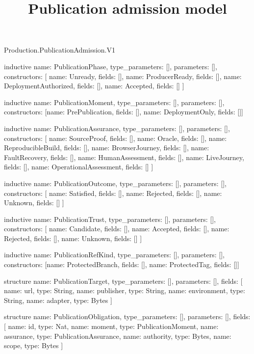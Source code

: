 \begin{lexlean}{Production.PublicationAdmission.V1}
\title{Publication admission model}
\begin{semanticmodule}
inductive{
  name: PublicationPhase,
  type_parameters: [],
  parameters: [],
  constructors: [
    {name: Unready, fields: []},
    {name: ProducerReady, fields: []},
    {name: DeploymentAuthorized, fields: []},
    {name: Accepted, fields: []}
  ]
}

inductive{
  name: PublicationMoment,
  type_parameters: [],
  parameters: [],
  constructors: [{name: PrePublication, fields: []}, {name: DeploymentOnly, fields: []}]
}

inductive{
  name: PublicationAssurance,
  type_parameters: [],
  parameters: [],
  constructors: [
    {name: SourceProof, fields: []},
    {name: Oracle, fields: []},
    {name: ReproducibleBuild, fields: []},
    {name: BrowserJourney, fields: []},
    {name: FaultRecovery, fields: []},
    {name: HumanAssessment, fields: []},
    {name: LiveJourney, fields: []},
    {name: OperationalAssessment, fields: []}
  ]
}

inductive{
  name: PublicationOutcome,
  type_parameters: [],
  parameters: [],
  constructors: [
    {name: Satisfied, fields: []},
    {name: Rejected, fields: []},
    {name: Unknown, fields: []}
  ]
}

inductive{
  name: PublicationTrust,
  type_parameters: [],
  parameters: [],
  constructors: [
    {name: Candidate, fields: []},
    {name: Accepted, fields: []},
    {name: Rejected, fields: []},
    {name: Unknown, fields: []}
  ]
}

inductive{
  name: PublicationRefKind,
  type_parameters: [],
  parameters: [],
  constructors: [{name: ProtectedBranch, fields: []}, {name: ProtectedTag, fields: []}]
}

structure{
  name: PublicationTarget,
  type_parameters: [],
  parameters: [],
  fields: [
    {name: url, type: String},
    {name: publisher, type: String},
    {name: environment, type: String},
    {name: adapter, type: Bytes}
  ]
}

structure{
  name: PublicationObligation,
  type_parameters: [],
  parameters: [],
  fields: [
    {name: id, type: Nat},
    {name: moment, type: PublicationMoment},
    {name: assurance, type: PublicationAssurance},
    {name: authority, type: Bytes},
    {name: scope, type: Bytes}
  ]
}


\end{semanticmodule}
\end{lexlean}
